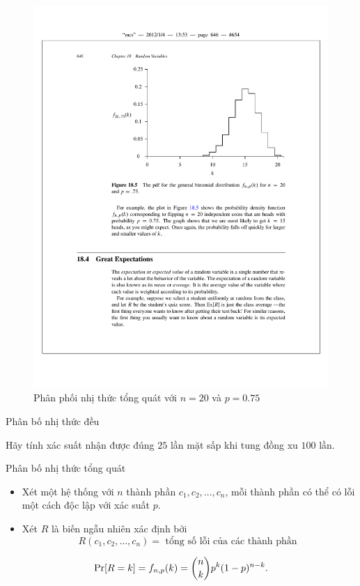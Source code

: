 \begin{frame}
	\begin{block}{}
	\begin{figure}[h]
	  \centering
	    \includegraphics[width=.9\textwidth]{fig185.pdf}
	  \caption{Phân phối nhị thức tổng quát với $n=20$ và $p=0.75$}
	  \label{fig:fig185}
	\end{figure}		
	\end{block}
	
\end{frame}
\begin{frame}{Phân bố nhị thức đều}
	\begin{qstn}
		Hãy tính xác suất nhận được đúng $25$ lần mặt sấp khi tung đồng xu $100$ lần.
	\end{qstn}
\end{frame}
\begin{frame}{Phân bố nhị thức tổng quát}
	\begin{itemize}
		\item Xét một hệ thống với $n$ thành phần $c_1, c_2, \dots, c_n$, mỗi thành phần có thể có lỗi một cách độc lập với xác suất $p$.
		\item Xét $R$ là biến ngẫu nhiên xác định  bởi 
		\[
			R(c_1, c_2, \dots, c_n) = \text{ tổng số lỗi của các thành phần  }
		\]   
	\end{itemize}
	
	\begin{thrm}
		\[
			\mathrm{Pr}[R = k] = f_{n,p} (k) = \binom{n}{k} p^k (1-p)^{n-k}. 
		\]
	\end{thrm}
\end{frame}




